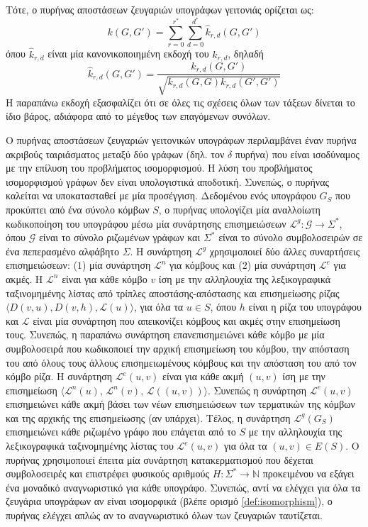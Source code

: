 Τότε, ο πυρήνας αποστάσεων ζευγαριών υπογράφων γειτονιάς ορίζεται ως:
\begin{equation}
    k(G, G') = \sum_{r=0}^{r^*} \sum_{d=0}^{d^*} \hat{k}_{r,d}(G, G')
\end{equation}
όπου $\hat{k}_{r,d}$ είναι μία κανονικοποιημένη εκδοχή του $k_{r,d}$, δηλαδή
\begin{equation*}
    \hat{k}_{r,d}(G,G') = \frac{k_{r,d}(G,G')}{\sqrt{k_{r,d}(G,G) k_{r,d}(G',G')}}
\end{equation*}
Η παραπάνω εκδοχή εξασφαλίζει ότι σε όλες τις σχέσεις όλων των τάξεων δίνεται το ίδιο βάρος, αδιάφορα από το μέγεθος των επαγόμενων συνόλων.\par
Ο πυρήνας αποστάσεων ζευγαριών γειτονικών υπογράφων περιλαμβάνει έναν πυρήνα ακριβούς ταιριάσματος μεταξύ δύο γράφων (δηλ. τον $\delta$ πυρήνα) που είναι ισοδύναμος με την επίλυση του προβλήματος ισομορφισμού.
Η λύση του προβλήματος ισομορφισμού γράφων δεν είναι υπολογιστικά αποδοτική.
Συνεπώς, ο πυρήνας καλείται να υποκατασταθεί με μία προσέγγιση.
Δεδομένου ενός υπογράφου $G_S$ που προκύπτει από ένα σύνολο κόμβων $S$, ο πυρήνας υπολογίζει μία αναλλοίωτη κωδικοποίηση του υπογράφου μέσω μία συνάρτησης επισημειώσεων $\mathcal{L}^g : \mathcal{G} \rightarrow \Sigma^*$, όπου $\mathcal{G}$ είναι το σύνολο ριζωμένων γράφων και $\Sigma^*$ είναι το σύνολο συμβολοσειρών σε ένα πεπερασμένο αλφάβητο $\Sigma$.
Η συνάρτηση $\mathcal{L}^g$ χρησιμοποιεί δύο άλλες συναρτήσεις επισημειώσεων: ($1$) μία συνάρτηση $\mathcal{L}^n$ για κόμβους και ($2$) μία συνάρτηση $\mathcal{L}^e$ για ακμές.
Η $\mathcal{L}^n$ είναι για κάθε κόμβο $v$ ίση με την αλληλουχία της λεξικογραφικά ταξινομημένης λίστας από τρίπλες αποστάσης-απόστασης και επισημείωσης ρίζας $\langle D(v,u), D(v,h), \mathcal{L}(u) \rangle$, για όλα τα $u \in S$, όπου $h$ είναι η ρίζα του υπογράφου και $\mathcal{L}$ είναι μία συνάρτηση που απεικονίζει κόμβους και ακμές στην επισημείωση τους.
Συνεπώς, η παραπάνω συνάρτηση επανεπισημειώνει κάθε κόμβο με μία συμβολοσειρά που κωδικοποιεί την αρχική επισημείωση του κόμβου, την απόσταση του από όλους τους άλλους επισημειωμένους κόμβους και την απόσταση του από τον κόμβο ρίζα.
Η συνάρτηση $\mathcal{L}^e(u,v)$ είναι για κάθε ακμή $(u,v)$ ίση με την επισημείωση $\langle \mathcal{L}^n(u)$, $\mathcal{L}^n(v)$, $\mathcal{L}((u,v)) \rangle$.
Συνεπώς η συνάρτηση $\mathcal{L}^e(u,v)$ επισημειώνει κάθε ακμή βάσει των νέων επισημειώσεων των τερματικών της κόμβων και της αρχικής της επισημείωσης (αν υπάρχει).
Τέλος, η συνάρτηση $\mathcal{L}^g(G_S)$ επισημειώνει κάθε ριζωμένο γράφο που επάγεται από το $S$ με την αλληλουχία της λεξικογραφικά ταξινομημένης λίστας του $\mathcal{L}^e(u,v)$ για όλα τα $(u,v) \in E(S)$.
Ο πυρήνας χρησιμοποιεί έπειτα μία συνάρτηση κατακερματισμού που δέχεται συμβολοσειρές και επιστρέφει φυσικούς αριθμούς $H : \Sigma^* \rightarrow \mathbb{N}$ προκειμένου να εξάγει ένα μοναδικό αναγνωριστικό για κάθε υπογράφο.
Συνεπώς, αντί να ελέγχει για όλα τα ζευγάρια υπογράφων αν είναι ισομορφικά (βλέπε ορισμό \ref{def:isomorphism}), ο πυρήνας ελέγχει απλώς αν το αναγνωριστικό όλων των ζευγαριών ταυτίζεται.

